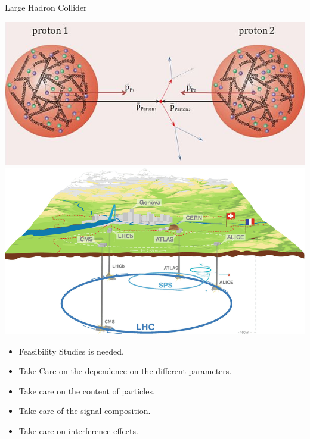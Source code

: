\documentclass{../bredelebeamer}
\begin{document}
\begin{frame}{Large Hadron Collider}
	\begin{minipage}{.55\linewidth}
		{\centering
		\includegraphics[width=.9\linewidth]{pp_collision.png}
		\includegraphics[width=.99\linewidth]{../2023_paper/LHC.png}
		}
	\end{minipage}
	\pause \hfill
	\begin{minipage}{.42\linewidth}
		\begin{itemize}
			\item Feasibility Studies is needed.
			$$ $$
			\item Take Care on the dependence on the different parameters.
			$$ $$
			\item Take care on the content of particles.
			$$ $$
			\item Take care of the signal composition.
			$$ $$
			\item Take care on interference effects.
		\end{itemize}
	\end{minipage}
\end{frame}
\end{document}
